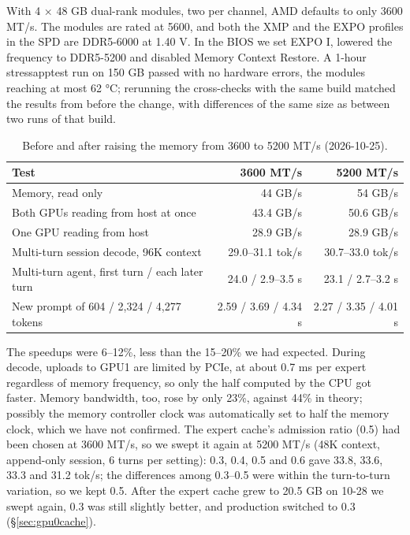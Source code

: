 \documentclass[11pt,a4paper]{article}
\newcommand{\tps}{tok/s}
\begin{document}
With 4 × 48 GB dual-rank modules, two per channel, AMD defaults to only 3600 MT/s. The modules are rated at 5600, and both the XMP and the EXPO profiles in the SPD are DDR5-6000 at 1.40 V. In the BIOS we set EXPO I, lowered the frequency to DDR5-5200 and disabled Memory Context Restore. A 1-hour stressapptest run on 150 GB passed with no hardware errors, the modules reaching at most 62 °C; rerunning the cross-checks with the same build matched the results from before the change, with differences of the same size as between two runs of that build.

\begin{table}[h]
  \centering
  \small
  \caption{Before and after raising the memory from 3600 to 5200 MT/s (2026-10-25).}
  \label{tab:ddr5200}
  \begin{tabular}{@{}l r r@{}}
    \toprule
    Test & 3600 MT/s & 5200 MT/s \\
    \midrule
    Memory, read only & 44 GB/s & 54 GB/s \\
    Both GPUs reading from host at once & 43.4 GB/s & 50.6 GB/s \\
    One GPU reading from host & 28.9 GB/s & 28.9 GB/s \\
    Multi-turn session decode, 96K context & 29.0--31.1 \tps{} & 30.7--33.0 \tps{} \\
    Multi-turn agent, first turn / each later turn & 24.0 / 2.9--3.5 s & 23.1 / 2.7--3.2 s \\
    New prompt of 604 / 2,324 / 4,277 tokens & 2.59 / 3.69 / 4.34 s & 2.27 / 3.35 / 4.01 s \\
    \bottomrule
  \end{tabular}
\end{table}

The speedups were 6--12\%, less than the 15--20\% we had expected. During decode, uploads to GPU1 are limited by PCIe, at about 0.7 ms per expert regardless of memory frequency, so only the half computed by the CPU got faster. Memory bandwidth, too, rose by only 23\%, against 44\% in theory; possibly the memory controller clock was automatically set to half the memory clock, which we have not confirmed. The expert cache's admission ratio (0.5) had been chosen at 3600 MT/s, so we swept it again at 5200 MT/s (48K context, append-only session, 6 turns per setting): 0.3, 0.4, 0.5 and 0.6 gave 33.8, 33.6, 33.3 and 31.2 \tps{}; the differences among 0.3--0.5 were within the turn-to-turn variation, so we kept 0.5. After the expert cache grew to 20.5 GB on 10-28 we swept again, 0.3 was still slightly better, and production switched to 0.3 (\S\ref{sec:gpu0cache}).
\end{document}
